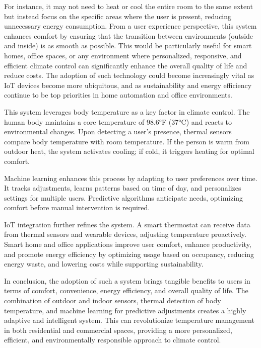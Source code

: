 \documentclass[a4paper]{scrartcl}
\begin{document}
For instance, it may not need to heat or cool the entire room to the same extent but instead focus on the specific areas where the user is present, reducing unnecessary energy consumption. From a user experience perspective, this system enhances comfort by ensuring that the transition between environments (outside and inside) is as smooth as possible. This would be particularly useful for smart homes, office spaces, or any environment where personalized, responsive, and efficient climate control can significantly enhance the overall quality of life and reduce costs. The adoption of such technology could become increasingly vital as IoT devices become more ubiquitous, and as sustainability and energy efficiency continue to be top priorities in home automation and office environments.

This system leverages body temperature as a key factor in climate control. The human body maintains a core temperature of 98.6°F (37°C) and reacts to environmental changes. Upon detecting a user’s presence, thermal sensors compare body temperature with room temperature. If the person is warm from outdoor heat, the system activates cooling; if cold, it triggers heating for optimal comfort.

Machine learning enhances this process by adapting to user preferences over time. It tracks adjustments, learns patterns based on time of day, and personalizes settings for multiple users. Predictive algorithms anticipate needs, optimizing comfort before manual intervention is required.

IoT integration further refines the system. A smart thermostat can receive data from thermal sensors and wearable devices, adjusting temperature proactively. Smart home and office applications improve user comfort, enhance productivity, and promote energy efficiency by optimizing usage based on occupancy, reducing energy waste, and lowering costs while supporting sustainability.

In conclusion, the adoption of such a system brings tangible benefits to users in terms of comfort, convenience, energy efficiency, and overall quality of life. The combination of outdoor and indoor sensors, thermal detection of body temperature, and machine learning for predictive adjustments creates a highly adaptive and intelligent system. This can revolutionize temperature management in both residential and commercial spaces, providing a more personalized, efficient, and environmentally responsible approach to climate control.
\end{document}
